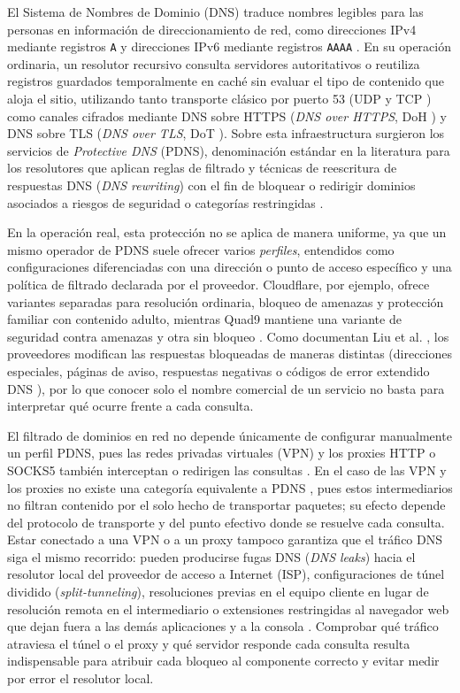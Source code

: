 \documentclass[10pt,a4paper]{article}
\begin{document}
El Sistema de Nombres de Dominio (DNS) traduce nombres legibles para las personas en información de direccionamiento de red, como direcciones IPv4 mediante registros \texttt{A} \cite{rfc1034,rfc1035} y direcciones IPv6 mediante registros \texttt{AAAA} \cite{rfc3596}. En su operación ordinaria, un resolutor recursivo consulta servidores autoritativos o reutiliza registros guardados temporalmente en caché sin evaluar el tipo de contenido que aloja el sitio, utilizando tanto transporte clásico por puerto 53 (UDP y TCP \cite{rfc7766}) como canales cifrados mediante DNS sobre HTTPS (\emph{DNS over HTTPS}, DoH \cite{rfc8484}) y DNS sobre TLS (\emph{DNS over TLS}, DoT \cite{rfc7858}). Sobre esta infraestructura surgieron los servicios de \emph{Protective DNS} (PDNS), denominación estándar en la literatura para los resolutores que aplican reglas de filtrado y técnicas de reescritura de respuestas DNS (\emph{DNS rewriting}) con el fin de bloquear o redirigir dominios asociados a riesgos de seguridad o categorías restringidas \cite{liu2024,plonka2025}.

En la operación real, esta protección no se aplica de manera uniforme, ya que un mismo operador de PDNS suele ofrecer varios \emph{perfiles}, entendidos como configuraciones diferenciadas con una dirección o punto de acceso específico y una política de filtrado declarada por el proveedor. Cloudflare, por ejemplo, ofrece variantes separadas para resolución ordinaria, bloqueo de amenazas y protección familiar con contenido adulto, mientras Quad9 mantiene una variante de seguridad contra amenazas y otra sin bloqueo \cite{cloudflare,quad9}. Como documentan Liu et al. \cite{liu2024}, los proveedores modifican las respuestas bloqueadas de maneras distintas (direcciones especiales, páginas de aviso, respuestas negativas o códigos de error extendido DNS \cite{rfc8914}), por lo que conocer solo el nombre comercial de un servicio no basta para interpretar qué ocurre frente a cada consulta.

El filtrado de dominios en red no depende únicamente de configurar manualmente un perfil PDNS, pues las redes privadas virtuales (VPN) y los proxies HTTP o SOCKS5 también interceptan o redirigen las consultas \cite{rfc9110,rfc1928}. En el caso de las VPN y los proxies no existe una categoría equivalente a PDNS \cite{rfc9110,rfc1928,khan2018vpn,tsirantonakis2018proxy}, pues estos intermediarios no filtran contenido por el solo hecho de transportar paquetes; su efecto depende del protocolo de transporte y del punto efectivo donde se resuelve cada consulta. Estar conectado a una VPN o a un proxy tampoco garantiza que el tráfico DNS siga el mismo recorrido: pueden producirse fugas DNS (\emph{DNS leaks}) hacia el resolutor local del proveedor de acceso a Internet (ISP), configuraciones de túnel dividido (\emph{split-tunneling}), resoluciones previas en el equipo cliente en lugar de resolución remota en el intermediario o extensiones restringidas al navegador web que dejan fuera a las demás aplicaciones y a la consola \cite{quad9faq,khan2018vpn}. Comprobar qué tráfico atraviesa el túnel o el proxy y qué servidor responde cada consulta resulta indispensable para atribuir cada bloqueo al componente correcto y evitar medir por error el resolutor local.
\end{document}
